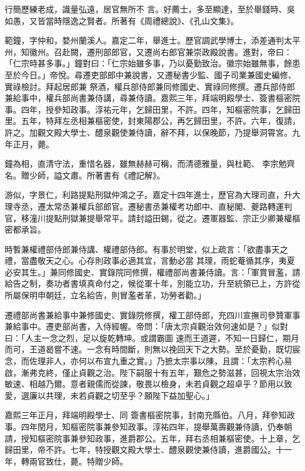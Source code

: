 \begin{pinyinscope}
 行簡歷練老成，識量弘遠，居官無所不
 言。好薦士，多至顯達，至於舉錢時、吳如愚，又皆當時隱逸之賢者。所著有《周禮總說》、《孔山文集》。



 範鐘，字仲和，婺州蘭溪人。嘉定二年，舉進士。歷官調武學博士，添差通判太平州，知徽州。召赴闕，遷刑部郎官，又遷尚右郎官兼崇政殿說書。進對，帝曰：「仁宗時甚多事。」鐘對曰：「仁宗始雖多事，乃以憂勤致治。徽宗始雖無事，餘患至於今日。」帝悅。尋遷吏部郎中兼說書，又遷秘書少監、國子司業兼國史編修、實祿檢討。拜起居郎兼
 祭酒，權兵部侍郎兼同修國史、實祿同修撰。遷兵部侍郎兼給事中，權兵部尚書兼侍講，尋兼侍讀。嘉熙三年，拜端明殿學士、簽書樞密院事。四年，授參知政事。淳祐元年，乞歸田里，不許。四年，知樞密院事，乞歸田里。五年，特拜左丞相兼樞密使，封東陽郡公，再乞歸田里，不許。六年，復請，許之。加觀文殿大學士、醴泉觀使兼侍讀，辭不拜，以保晚節，乃提舉洞霄宮。九年正月，薨。



 鐘為相，直清守法，重惜名器，雖無赫赫可稱，而清德雅量，與杜範、
 李宗勉齊名。贈少師，謚文肅。所著書有《禮記解》。



 游似，字景仁，利路提點刑獄仲鴻之子。嘉定十四年進士，歷官為大理司直，升大理寺丞，遷太常丞兼權兵部郎官。遷秘書丞兼權考功郎中、直秘閣、夔路轉運判官，移潼川提點刑獄兼提舉常平。請封謚田錫，從之。遷軍器監、宗正少卿兼權樞密都承旨。



 時暫兼權禮部侍郎兼侍講、權禮部侍郎。有事於明堂，似上疏言：「欲盡事天之禮，當盡敬天之心。心存則政事必適其宜，言動必當
 其理，雨蛇菴循其序，夷夏必安其生。」兼同修國史、實錄院同修撰，權禮部尚書兼侍讀。言：「軍賞冒濫，請給告之制，奏功者書填真命付之，候從軍十年，別能立功，升至統領已上，方許從所屬保明申朝廷，立名給告，則冒濫者革，功勞者勸。」



 遷禮部尚書兼給事中兼修國史、實錄院修撰，權工部侍郎，充四川宣撫司參贊軍事兼給事中。遷吏部尚書，入侍經幄。帝問：「唐太宗貞觀治效何速如是？」似對曰：「人主一念之烈，足以旋乾轉坤。或謂霸圖
 速而王道遲，不知一日歸仁，期月而可，王道曷嘗不速。一念有時間斷，則無以挽回天下之大勢。至於憂勤，既切宸念，而佐理非人，亦何以布宣九重之實。」乃摭太宗事以陳，且謂：「太宗矜心易啟，漸弗克終，僅止貞觀之治。陛下嗣服十有五年，艱危之勢滋甚，回視太宗治效敏速、相越乃爾。意者親儒而從諫，敬畏以檢身，未若貞觀之超卓乎？節用以致愛，選廉以共理，未若貞觀之切至乎？願陛下益加聖心。」



 嘉熙三年正月，拜端明殿學士、同
 簽書樞密院事，封南充縣伯。八月，拜參知政事。四年閏月，知樞密院事兼參知政事。淳祐四年，提舉萬壽觀兼侍讀，仍奉朝請，授知樞密院事兼參知政事，進爵郡公。五年，拜右丞相兼樞密使。十上章，乞歸田里，帝不許。七年，特授觀文殿大學士、醴泉觀使兼侍讀，進爵國公。十一年，轉兩官致仕，薨。特贈少師。




\end{pinyinscope}
